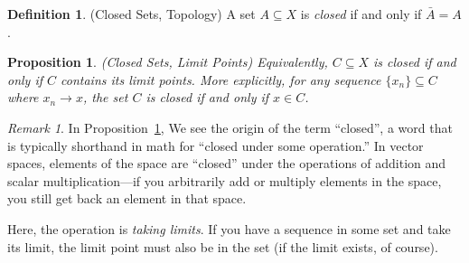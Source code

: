 \documentclass[12pt]{article}
\numberwithin{equation}{section} %
\theoremstyle{plain}
\newtheorem{prop}[thm]{Proposition}
\theoremstyle{definition}
\newtheorem{defn}[thm]{Definition}
\theoremstyle{remark}
\newtheorem*{rmk}{Remark}
\begin{document}
\begin{defn}{(Closed Sets, Topology)}
\label{defn:closed}
A set $A\subseteq X$ is \emph{closed} if and only if $\bar{A} = A$.
\end{defn}

\begin{prop}{\emph{(Closed Sets, Limit Points)}}
\label{prop:closed}
Equivalently, $C\subseteq X$ is \emph{closed} if and only if $C$
contains its limit points. More explicitly, for any sequence
$\{x_n\}\subseteq C$ where $x_n\rightarrow x$, the set $C$ is closed if
and only if $x\in C$.
\end{prop}
\begin{rmk}
In Proposition~\ref{prop:closed}, We see the origin of the term
``closed'', a word that is typically shorthand in math for ``closed
under some operation.'' In vector spaces, elements of the space are
``closed'' under the operations of addition and scalar
multiplication---if you arbitrarily add or multiply elements in the
space, you still get back an element in that space.

Here, the operation is \emph{taking limits}. If you have a sequence in
some set and take its limit, the limit point must also be in the set (if
the limit exists, of course).
\end{rmk}
\end{document}
